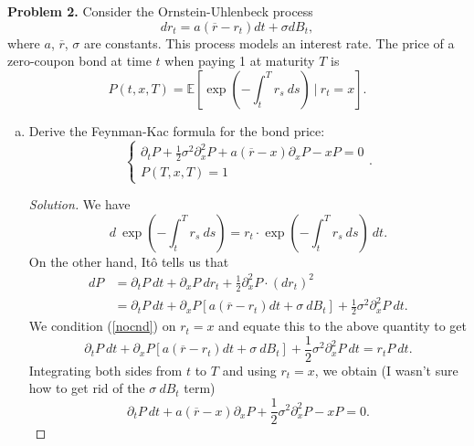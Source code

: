 \documentclass[11pt,letterpaper]{report}
\newcommand{\E}{\mathbb{E}}
\newenvironment{solution}
{\begin{proof}[Solution]}
{\end{proof}}
\begin{document}
\noindent\textbf{Problem 2. }
Consider the Ornstein-Uhlenbeck process
\begin{equation}\label{O-U}
	dr_t = a(\overline{r}-r_t)dt + \sigma dB_t,
\end{equation}
where $a$, $\overline{r}$, $\sigma$ are constants. This process models an interest rate. The price of a zero-coupon bond at time $t$ when paying 1 at maturity $T$ is
\[
P(t, x, T) = \E\left[\exp\left(-\int_t^Tr_s\ ds\right)\ |\ r_t = x \right].
\]
\begin{enumerate}[(a)]
	\item Derive the Feynman-Kac formula for the bond price:
	\begin{equation}\label{F-K}
		\begin{cases}
			\partial_tP + \frac{1}{2}\sigma^2\partial_x^2P + a(\overline{r}-x)\partial_xP-xP = 0\\
			P(T, x, T) = 1
		\end{cases}.
	\end{equation}
	\begin{solution}
		We have
		\begin{equation}\label{nocnd}
		d\ \exp\left(-\int_t^Tr_s\ ds \right) = r_t\cdot \exp\left(-\int_t^Tr_s\ ds \right)\ dt.
		\end{equation}
		On the other hand, It\^o tells us that
		\begin{align*}
		dP &= \partial_tP\ dt + \partial_xP\ dr_t + \frac{1}{2}\partial_x^2P\cdot (dr_t)^2\\
		&= \partial_tP\ dt + \partial_xP[a(\overline{r}-r_t)dt + \sigma\ dB_t] + \frac{1}{2}\sigma^2\partial^2_xP\ dt.
		\end{align*}
		We condition (\ref{nocnd}) on $r_t = x$ and equate this to the above quantity to get
		\[
		\partial_tP\ dt + \partial_xP[a(\overline{r}-r_t)dt + \sigma\ dB_t] + \frac{1}{2}\sigma^2\partial^2_xP\ dt = r_tP\ dt.
		\]
		Integrating both sides from $t$ to $T$ and using $r_t = x$, we obtain (I wasn't sure how to get rid of the $\sigma\ dB_t$ term)
		\[
		\partial_tP\ dt + a(\overline{r}-x)\partial_xP + \frac{1}{2}\sigma^2\partial^2_xP - xP = 0.
		\]
	\end{solution}


\end{enumerate}
\end{document}
